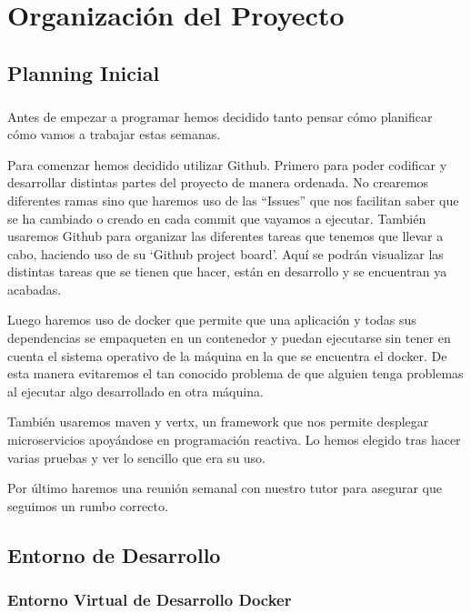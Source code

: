 \chapter{Organización del Proyecto}

\paragraph{}
\section{Planning Inicial}
\paragraph{}
Antes de empezar a programar hemos decidido tanto pensar cómo
planificar cómo vamos a trabajar estas semanas.

Para comenzar hemos decidido utilizar Github. Primero para poder
codificar y desarrollar distintas partes del proyecto de manera
ordenada. No crearemos diferentes ramas sino que haremos uso de las
“Issues” que nos facilitan saber que se ha cambiado o creado en cada
commit que vayamos a ejecutar. También usaremos Github para organizar
las diferentes tareas que tenemos que llevar a cabo, haciendo uso de
su ‘Github project board’. Aquí se podrán visualizar las distintas
tareas que se tienen que hacer, están en desarrollo y se encuentran ya
acabadas.

Luego haremos uso de docker que permite que una aplicación y todas sus
dependencias se empaqueten en un contenedor y puedan ejecutarse sin
tener en cuenta el sistema operativo de la máquina en la que se
encuentra el docker. De esta manera evitaremos el tan conocido
problema de que alguien tenga problemas al ejecutar algo desarrollado
en otra máquina.

También usaremos maven y vertx, un framework que nos permite desplegar
microservicios apoyándose en programación reactiva. Lo hemos elegido
tras hacer varias pruebas y ver lo sencillo que era su uso.

Por último haremos una reunión semanal con nuestro tutor para asegurar
que seguimos un rumbo correcto.

\section{Entorno de Desarrollo}

\subsection{Entorno Virtual de Desarrollo Docker}

